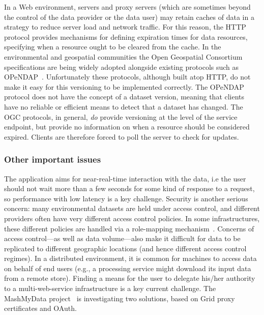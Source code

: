 In a Web environment, servers and proxy servers (which are sometimes beyond
the control of the data provider or the data user) may retain caches
of data in a strategy to reduce server load and network traffic.  For
this reason, the HTTP protocol provides mechanisms for defining expiration
times for data resources, specifying when a resource ought to be
cleared from the cache.  In the environmental and geospatial communities the Open Geospatial
Consortium specifications are being widely adopted alongside existing
protocols such as OPeNDAP~\cite{opendap}.  Unfortunately these protocols, although
built atop HTTP, do not make it easy for this versioning to be
implemented correctly.  The OPeNDAP protocol does not have the concept
of a dataset version, meaning that clients have no reliable or
efficient means to detect that a dataset has changed.  The OGC
protocols, in general, \emph{do} provide
versioning at the level of the service endpoint, but provide no
information on when a resource should be considered expired.  Clients
are therefore forced to poll the server to check for updates.

 \subsubsection*{Other important issues}



The application aims for near-real-time interaction with the data, i.e the user should not wait more than a few seconds for some kind of response to a request, so performance with low latency is a key challenge.
Security is another serious concern: many environmental datasets
are held under access control, and different providers often have very different access control policies.
In some infrastructures, these different policies are handled via a role-mapping mechanism~\cite{nerc_data}.
Concerns of access control---as well as data volume---also make it difficult for data to be replicated
to different geographic locations (and hence different access control regimes).
In a distributed environment, it is common for machines to access data
on behalf of end users (e.g., a processing service might download its input data from a remote store).
Finding a means for the user to delegate his/her authority to a multi-web-service infrastructure is
a key current challenge.  The MashMyData project~\cite{mashmydata} is investigating two solutions, based on Grid proxy certificates and OAuth.


